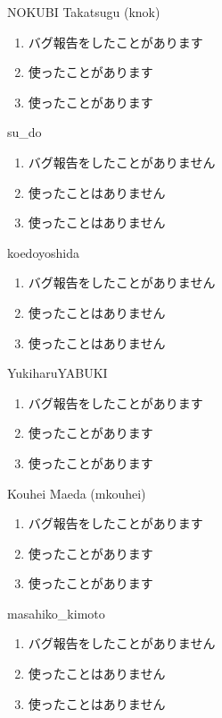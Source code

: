 \begin{prework}{ NOKUBI Takatsugu (knok) }
  \begin{enumerate}
  \item バグ報告をしたことがあります
  \item 使ったことがあります
  \item 使ったことがあります 
  \end{enumerate}
\end{prework}

\begin{prework}{ su\_do }
  \begin{enumerate}
  \item バグ報告をしたことがありません
  \item 使ったことはありません
  \item 使ったことはありません
  \end{enumerate}
\end{prework}

\begin{prework}{ koedoyoshida }
  \begin{enumerate}
  \item バグ報告をしたことがありません
  \item 使ったことはありません
  \item 使ったことはありません
  \end{enumerate}
\end{prework}

\begin{prework}{ YukiharuYABUKI }
  \begin{enumerate}
  \item バグ報告をしたことがあります
  \item 使ったことがあります
  \item 使ったことがあります
  \end{enumerate}
\end{prework}

\begin{prework}{ Kouhei Maeda (mkouhei) }
  \begin{enumerate}
  \item バグ報告をしたことがあります
  \item 使ったことがあります
  \item 使ったことがあります
  \end{enumerate}
\end{prework}

\begin{prework}{ masahiko\_kimoto }
  \begin{enumerate}
  \item バグ報告をしたことがありません
  \item 使ったことはありません
  \item 使ったことはありません
  \end{enumerate}
\end{prework}

